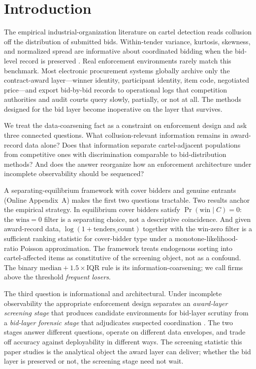 \section{Introduction}
\label{sec:intro}

The empirical industrial-organization literature on cartel
detection reads collusion off the distribution of submitted bids.
Within-tender variance, kurtosis, skewness, and normalized spread
are informative about coordinated bidding when the bid-level
record is preserved
\citep{porter1993detection,bajari2003deciding,imhof2019detecting,wallimann2023machine}.
Real enforcement environments rarely match this benchmark. Most
electronic procurement systems globally archive only the
contract-award layer---winner identity, participant identity, item
code, negotiated price---and export bid-by-bid records to
operational logs that competition authorities and audit courts
query slowly, partially, or not at all. The methods designed for
the bid layer become inoperative on the layer that survives.

We treat the data-coarsening fact as a constraint on enforcement
design and ask three connected questions. What collusion-relevant
information remains in award-record data alone? Does that
information separate cartel-adjacent populations from competitive
ones with discrimination comparable to bid-distribution methods?
And does the answer reorganize how an enforcement architecture
under incomplete observability should be sequenced?

A separating-equilibrium framework with cover bidders and genuine
entrants (Online Appendix~A) makes the first two questions
tractable. Two results anchor the empirical strategy. In
equilibrium cover bidders satisfy $\Pr(\text{win}\mid C)=0$: the
$\text{wins}=0$ filter is a separating choice, not a descriptive
coincidence. And given award-record data,
$\log(1+\text{tenders\_count})$ together with the win-zero filter
is a sufficient ranking statistic for cover-bidder type under a
monotone-likelihood-ratio Poisson approximation. The framework
treats endogenous sorting into cartel-affected items as
constitutive of the screening object, not as a confound. The
binary $\text{median}+1.5\!\times\!\text{IQR}$ rule is its
information-coarsening; we call firms above the threshold
\emph{frequent losers}.

The third question is informational and architectural. Under
incomplete observability the appropriate enforcement design
separates an \emph{award-layer screening stage} that produces
candidate environments for bid-layer scrutiny from a
\emph{bid-layer forensic stage} that adjudicates suspected
coordination
\citep{becker1968crime,stigler1970optimum,harrington2008detecting,decarolis2014awarding,kawai2022detection}.
The two stages answer different questions, operate on different
data envelopes, and trade off accuracy against deployability in
different ways. The screening statistic this paper studies is the
analytical object the award layer can deliver; whether the bid
layer is preserved or not, the screening stage need not wait.

